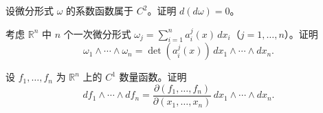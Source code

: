 \newpage
\noindent\begin{minipage}{\textwidth}
设微分形式 $\omega$ 的系数函数属于 $C^2$。证明 $d(d\omega)=0$。
\end{minipage}\par\vfill
\noindent\begin{minipage}{\textwidth}
考虑 $\mathbb R^n$ 中 $n$ 个一次微分形式 $\omega_j=\sum_{i=1}^n a_i^j(x)\,dx_i$（$j=1,\ldots,n$）。证明\[\omega_1\wedge\cdots\wedge\omega_n=\det(a_i^j(x))\,dx_1\wedge\cdots\wedge dx_n.\]
\end{minipage}\par\vfill
\noindent\begin{minipage}{\textwidth}
设 $f_1,\ldots,f_n$ 为 $\mathbb R^n$ 上的 $C^1$ 数量函数。证明\[df_1\wedge\cdots\wedge df_n=\frac{\partial(f_1,\ldots,f_n)}{\partial(x_1,\ldots,x_n)}\,dx_1\wedge\cdots\wedge dx_n.\]
\end{minipage}\par\vfill
